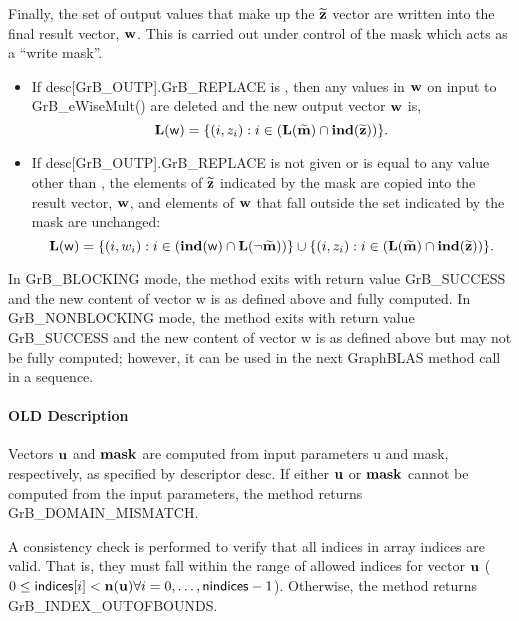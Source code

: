 Finally, the set of output values that make up the ${\bf \widetilde{z}}$ 
vector are written into the final result vector, ${\bf w}$. 
This is carried out under control of the mask which acts as a ``write mask''.
\begin{itemize}
\item If {\sf desc[GrB\_OUTP].GrB\_REPLACE} is \true, then any values in ${\bf w}$ 
on input to {\sf GrB\_eWiseMult()} are deleted and the new output vector ${\bf w}$ is,
\[ \bold{L}({\sf w}) = \{(i,z_{i}) : i \in (\bold{L}({\bf \widetilde{m}}) 
\cap \bold{ind}({\bf \widetilde{z}})) \}. \]

\item If {\sf desc[GrB\_OUTP].GrB\_REPLACE} is not given or is equal to any 
value other than \true, the elements of ${\bf \widetilde{z}}$ indicated by 
the mask are copied into the result vector, ${\bf w}$, and elements of 
${\bf w}$ that fall outside the set indicated by the mask are unchanged:
\[ \bold{L}({\sf w}) = \{(i,w_{i}) : i \in (\bold{ind}({\bf \sf w}) 
\cap \bold{L}(\neg {\bf \widetilde{m}})) \} \cup \{(i,z_{i}) : i \in 
(\bold{L}({\bf \widetilde{m}}) \cap \bold{ind}({\bf \widetilde{z}})) \}. \]
\end{itemize}

In {\sf GrB\_BLOCKING} mode, the method exits with return value 
{\sf GrB\_SUCCESS} and the new content of vector {\sf w} is as defined above
and fully computed.  
In {\sf GrB\_NONBLOCKING} mode, the method exits with return value 
{\sf GrB\_SUCCESS} and the new content of vector {\sf w} is as defined above 
but may not be fully computed; however, it can be used in the next GraphBLAS 
method call in a sequence.


\paragraph{OLD Description}

Vectors ${\bf u}$ and ${\bf mask}$ are computed from input
parameters {\sf u} and {\sf mask}, respectively, as specified by
descriptor {\sf desc}.  If either ${\bf u}$ or ${\bf mask}$
cannot be computed from the input parameters, the method returns {\sf
GrB\_DOMAIN\_MISMATCH}.

A consistency check is performed to verify that all indices in array
{\sf indices} are valid. That is, they must fall within the range of allowed
indices for vector ${\bf u}$ ($0 \leq {\sf indices}[i] < \bold{n}({\bf u})
\forall i = 0,\ldots,{\sf nindices}-1$).  Otherwise, the method returns {\sf
GrB\_INDEX\_OUTOFBOUNDS}.

